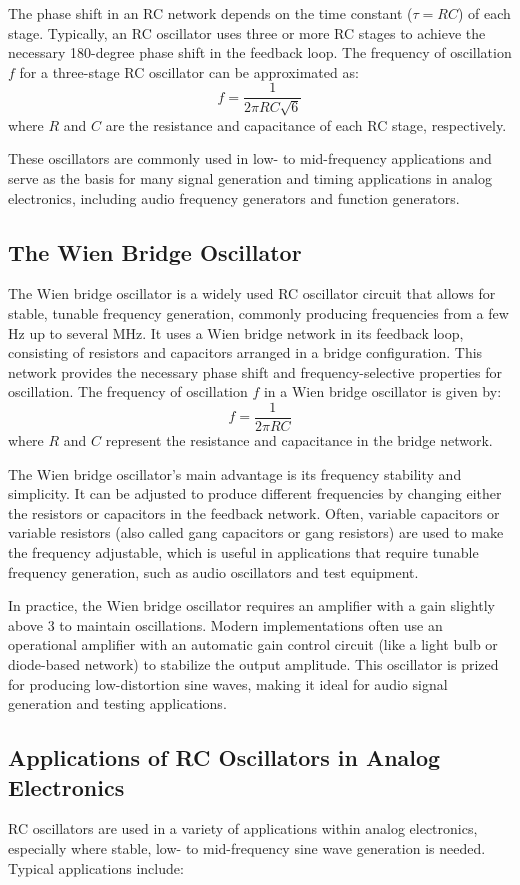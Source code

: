 \documentclass[12pt,a4paper]{report}
\begin{document}
The phase shift in an RC network depends on the time constant (\( \tau = RC \)) of each stage. Typically, an RC oscillator uses three or more RC stages to achieve the necessary 180-degree phase shift in the feedback loop. The frequency of oscillation \( f \) for a three-stage RC oscillator can be approximated as:
\[
f = \frac{1}{2 \pi R C \sqrt{6}}
\]
where \( R \) and \( C \) are the resistance and capacitance of each RC stage, respectively.

These oscillators are commonly used in low- to mid-frequency applications and serve as the basis for many signal generation and timing applications in analog electronics, including audio frequency generators and function generators.

\subsection{The Wien Bridge Oscillator}
The Wien bridge oscillator is a widely used RC oscillator circuit that allows for stable, tunable frequency generation, commonly producing frequencies from a few Hz up to several MHz. It uses a Wien bridge network in its feedback loop, consisting of resistors and capacitors arranged in a bridge configuration. This network provides the necessary phase shift and frequency-selective properties for oscillation. The frequency of oscillation \( f \) in a Wien bridge oscillator is given by:
\[
f = \frac{1}{2 \pi R C}
\]
where \( R \) and \( C \) represent the resistance and capacitance in the bridge network.

The Wien bridge oscillator’s main advantage is its frequency stability and simplicity. It can be adjusted to produce different frequencies by changing either the resistors or capacitors in the feedback network. Often, variable capacitors or variable resistors (also called gang capacitors or gang resistors) are used to make the frequency adjustable, which is useful in applications that require tunable frequency generation, such as audio oscillators and test equipment.

In practice, the Wien bridge oscillator requires an amplifier with a gain slightly above 3 to maintain oscillations. Modern implementations often use an operational amplifier with an automatic gain control circuit (like a light bulb or diode-based network) to stabilize the output amplitude. This oscillator is prized for producing low-distortion sine waves, making it ideal for audio signal generation and testing applications.

\subsection{Applications of RC Oscillators in Analog Electronics}
RC oscillators are used in a variety of applications within analog electronics, especially where stable, low- to mid-frequency sine wave generation is needed. Typical applications include:
\end{document}
